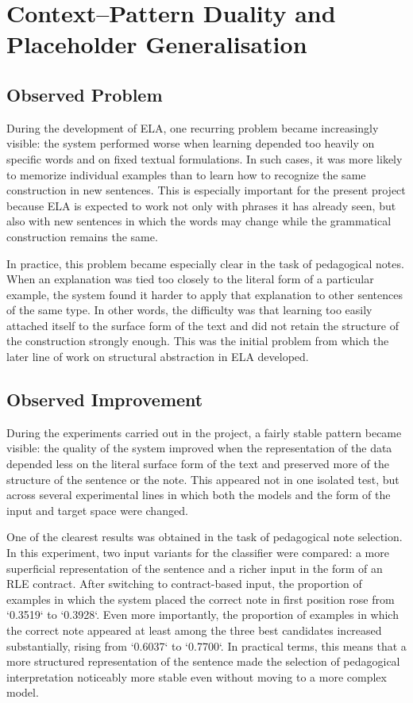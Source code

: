 \documentclass[12pt,a4paper,oneside]{report}
\begin{document}
\chapter{Context--Pattern Duality and Placeholder Generalisation}
\section{Observed Problem}
During the development of ELA, one recurring problem became increasingly visible: the system performed worse when learning depended too heavily on specific words and on fixed textual formulations. In such cases, it was more likely to memorize individual examples than to learn how to recognize the same construction in new sentences. This is especially important for the present project because ELA is expected to work not only with phrases it has already seen, but also with new sentences in which the words may change while the grammatical construction remains the same.

In practice, this problem became especially clear in the task of pedagogical notes. When an explanation was tied too closely to the literal form of a particular example, the system found it harder to apply that explanation to other sentences of the same type. In other words, the difficulty was that learning too easily attached itself to the surface form of the text and did not retain the structure of the construction strongly enough. This was the initial problem from which the later line of work on structural abstraction in ELA developed.

\section{Observed Improvement}

During the experiments carried out in the project, a fairly stable pattern became visible: the quality of the system improved when the representation of the data depended less on the literal surface form of the text and preserved more of the structure of the sentence or the note. This appeared not in one isolated test, but across several experimental lines in which both the models and the form of the input and target space were changed.

One of the clearest results was obtained in the task of pedagogical note selection. In this experiment, two input variants for the classifier were compared: a more superficial representation of the sentence and a richer input in the form of an RLE contract. After switching to contract-based input, the proportion of examples in which the system placed the correct note in first position rose from `0.3519` to `0.3928`. Even more importantly, the proportion of examples in which the correct note appeared at least among the three best candidates increased substantially, rising from `0.6037` to `0.7700`. In practical terms, this means that a more structured representation of the sentence made the selection of pedagogical interpretation noticeably more stable even without moving to a more complex model.
\end{document}
